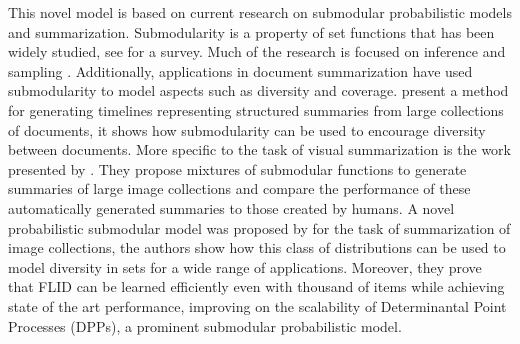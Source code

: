 This novel model is based on current research on submodular probabilistic models and summarization. Submodularity is a property of set functions that has been widely studied, see \cite{krause14submodular} for a survey. Much of the research is focused on inference \citep{djolonga14variational, djolonga15scalable} and sampling \citep{gotovos15sampling}. Additionally, applications in document summarization have used submodularity to model aspects such as diversity and coverage. \citet{Shahaf2012, Shahaf2013} present a method for generating timelines representing structured summaries from large collections of documents, it shows how submodularity can be used to encourage diversity between documents. More specific to the task of visual summarization is the work presented by \citet{Tschiatschek2014}. They propose mixtures of submodular functions to generate summaries of large image collections and compare the performance of these automatically generated summaries to those created by humans. A novel probabilistic submodular model was proposed by \citet{tschiatschek16learning} for the task of summarization of image collections, the authors show how this class of distributions can be used to model diversity in sets for a wide range of applications. Moreover, they prove that FLID can be learned efficiently even with thousand of items while achieving state of the art performance, improving on the scalability of Determinantal Point Processes (DPPs), a prominent submodular probabilistic model.